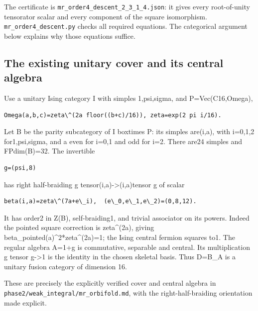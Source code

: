 The certificate is
\texttt{mr\_\allowbreak{}order4\allowbreak{}\_\allowbreak{}descen\allowbreak{}t\_\allowbreak{}2\_\allowbreak{}3\_\allowbreak{}1\_\allowbreak{}4.\allowbreak{}json}:
it gives every root-of-unity tensorator scalar and every component of
the square isomorphism.
\texttt{mr\_\allowbreak{}order4\allowbreak{}\_\allowbreak{}descen\allowbreak{}t.\allowbreak{}py}
checks all required equations. The categorical argument below explains
why those equations suffice.

\hypertarget{the-existing-unitary-cover-and-its-central-algebra}{%
\subsection{The existing unitary cover and its central
algebra}\label{the-existing-unitary-cover-and-its-central-algebra}}

Use a unitary Ising category I with simples 1,psi,sigma, and
P=Vec(C16,Omega),

\begin{verbatim}
Omega(a,b,c)=zeta\^(2a floor((b+c)/16)), zeta=exp(2 pi i/16).
\end{verbatim}

Let B be the parity subcategory of I boxtimes P: its simples are(i,a),
with i=0,1,2 for1,psi,sigma, and a even for i=0,1 and odd for i=2. There
are24 simples and FPdim(B)=32. The invertible

\begin{verbatim}
g=(psi,8)
\end{verbatim}

has right half-braiding g tensor(i,a)-\textgreater(i,a)tensor g of
scalar

\begin{verbatim}
beta(i,a)=zeta\^(7a+e\_i),  (e\_0,e\_1,e\_2)=(0,8,12).
\end{verbatim}

It has order2 in Z(B), self-braiding1, and trivial associator on its
powers. Indeed the pointed square correction is zeta\^{}(2a), giving
beta\_pointed(a)\^{}2*zeta\^{}(2a)=1; the Ising central fermion squares
to1. The regular algebra A=1+g is commutative, separable and central.
Its multiplication g tensor g-\textgreater1 is the identity in the
chosen skeletal basis. Thus D=B\_A is a unitary fusion category of
dimension 16.

These are precisely the explicitly verified cover and central algebra in
\texttt{phase2\allowbreak{}/\allowbreak{}weak\_\allowbreak{}integr\allowbreak{}al/\allowbreak{}mr\_\allowbreak{}orbifo\allowbreak{}ld.\allowbreak{}md},
with the right-half-braiding orientation made explicit.

